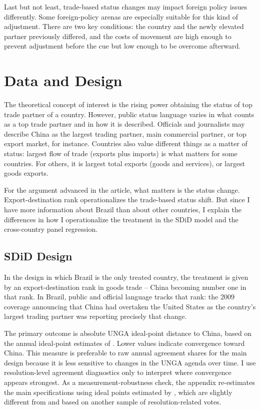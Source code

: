 \documentclass[referee,pdflatex,sn-basic]{sn-jnl}
\theoremstyle{thmstylethree}
\begin{document}
Last but not least, trade-based status changes may impact foreign policy issues differently. Some foreign-policy arenas are especially suitable for this kind of adjustment. There are two key conditions: the country and the newly elevated partner previously differed, and the costs of movement are high enough to prevent adjustment before the cue but low enough to be overcome afterward.

\section{Data and Design}\label{data-and-design}

The theoretical concept of interest is the rising power obtaining the status of top trade partner of a country. However, public status language varies in what counts as a top trade partner and in how it is described. Officials and journalists may describe China as the largest trading partner, main commercial partner, or top export market, for instance. Countries also value different things as a matter of status: largest flow of trade (exports plus imports) is what matters for some countries. For others, it is largest total exports (goods and services), or largest goods exports.

For the argument advanced in the article, what matters is the status change. Export-destination rank operationalizes the trade-based status shift. But since I have more information about Brazil than about other countries, I explain the differences in how I operationalize the treatment in the SDiD model and the cross-country panel regression.

\subsection{SDiD Design}\label{sdid-design}

In the design in which Brazil is the only treated country, the treatment is given by an export-destination rank in goods trade -- China becoming number one in that rank. In Brazil, public and official language tracks that rank: the 2009 coverage announcing that China had overtaken the United States as the country's largest trading partner was reporting precisely that change.

The primary outcome is absolute UNGA ideal-point distance to China, based on the annual ideal-point estimates of \citet{bailey_etal2017}. Lower values indicate convergence toward China. This measure is preferable to raw annual agreement shares for the main design because it is less sensitive to changes in the UNGA agenda over time. I use resolution-level agreement diagnostics only to interpret where convergence appears strongest. As a measurement-robustness check, the appendix re-estimates the main specifications using ideal points estimated by \citet{fjelstul_etal2026}, which are slightly different from \citet{bailey_etal2017} and based on another sample of resolution-related votes.
\end{document}
